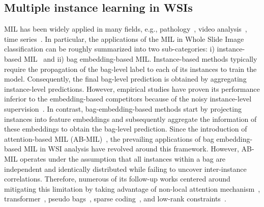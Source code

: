 \documentclass[runningheads]{llncs}
\begin{document}
\subsection{Multiple instance learning in WSIs}
MIL has been widely applied in many fields, e.g., pathology~\cite{ilse2018attention,li2021dual,shao2021transmil,zhang2022dtfd}, video analysis~\cite{babenko2010robust,quellec2017multiple}, time series~\cite{early2024inherently,chen2024timemil}.
In particular, the applications of the MIL in Whole Slide Image classification can be roughly summarized into two sub-categories: i) instance-based MIL~\cite{feng2017deep, hou2016patch, xu2019camel} and ii) bag embedding-based MIL. Instance-based methods typically require the propagation of the bag-level label to each of its instances to train the model. Consequently, the final bag-level prediction is obtained by aggregating instance-level predictions. However, empirical studies have proven its performance inferior to the embedding-based competitors because of the noisy instance-level supervision~\cite{wang2018revisiting}. In contrast, bag-embedding-based methods start by projecting instances into feature embeddings and subsequently aggregate the information of these embeddings to obtain the bag-level prediction. Since the introduction of attention-based MIL (AB-MIL)~\cite{ilse2018attention}, the prevailing applications of bag embedding-based MIL in WSI analysis have revolved around this framework. However, AB-MIL operates under the assumption that all instances within a bag are independent and identically distributed while failing to uncover inter-instance correlations. Therefore, numerous of its follow-up works centered around mitigating this limitation by taking advantage of non-local attention mechanism~\cite{li2021dual}, transformer~\cite{shao2021transmil}, pseudo bags~\cite{zhang2022dtfd}, sparse coding~\cite{qiu2023sc}, and low-rank constraints~\cite{lowrankmil}. 
\end{document}
